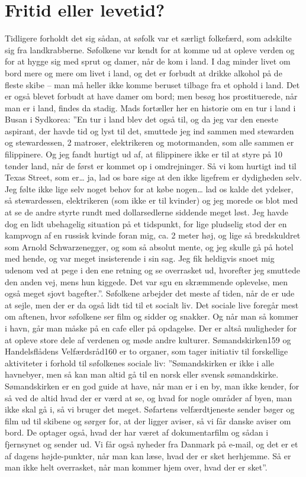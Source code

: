 \chapter{Fritid eller levetid?}\label{fritid-eller-levetid}

Tidligere forholdt det sig sådan, at søfolk var et særligt folkefærd,
som adskilte sig fra landkrabberne. Søfolkene var kendt for at komme ud
at opleve verden og for at hygge sig med sprut og damer, når de kom i
land. I dag minder livet om bord mere og mere om livet i land, og det er
forbudt at drikke alkohol på de fleste skibe -- man må heller ikke komme
beruset tilbage fra et ophold i land. Det er også blevet forbudt at have
damer om bord; men besøg hos prostituerede, når man er i land, findes da
stadig. Mads fortæller her en historie om en tur i land i Busan i
Sydkorea: ''En tur i land blev det også til, og da jeg var den eneste
aspirant, der havde tid og lyst til det, smuttede jeg ind sammen med
stewarden og stewardessen, 2 matroser, elektrikeren og motormanden, som
alle sammen er filippinere. Og jeg fandt hurtigt ud af, at filippinere
ikke er til at styre på 10 tønder land, når de først er kommet op i
omdrejninger. Så vi kom hurtigt ind til Texas Street, som er\ldots{} ja,
lad os bare sige at den ikke ligefrem er dydigheden selv. Jeg følte ikke
lige selv noget behov for at købe nogen\ldots{} lad os kalde det
ydelser, så stewardessen, elektrikeren (som ikke er til kvinder) og jeg
morede os blot med at se de andre styrte rundt med dollarsedlerne
siddende meget løst. Jeg havde dog en lidt ubehagelig situation på et
tidspunkt, for lige pludselig stod der en kampvogn af en russisk kvinde
foran mig, ca. 2 meter høj, og lige så bredskuldret som Arnold
Schwarzenegger, og som så absolut mente, og jeg skulle gå på hotel med
hende, og var meget insisterende i sin sag. Jeg fik heldigvis snoet mig
udenom ved at pege i den ene retning og se overrasket ud, hvorefter jeg
smuttede den anden vej, mens hun kiggede. Det var sgu en skræmmende
oplevelse, men også meget sjovt bagefter.''. Søfolkene arbejder det
meste af tiden, når de er ude at sejle, men der er da også lidt tid til
et socialt liv. Det sociale live foregår mest om aftenen, hvor søfolkene
ser film og sidder og snakker. Og når man så kommer i havn, går man
måske på en cafe eller på opdagelse. Der er altså muligheder for at
opleve store dele af verdenen og møde andre kulturer. Sømandskirken159
og Handelsflådens Velfærdsråd160 er to organer, som tager initiativ til
forskellige aktiviteter i forhold til søfolkenes sociale liv:
''Sømandskirken er ikke i alle havnebyer, men så kan man altid gå til en
norsk eller svensk sømandskirke. Sømandskirken er en god guide at have,
når man er i en by, man ikke kender, for så ved de altid hvad der er
værd at se, og hvad for nogle områder af byen, man ikke skal gå i, så vi
bruger det meget. Søfartens velfærdtjeneste sender bøger og film ud til
skibene og sørger for, at der ligger aviser, så vi får danske aviser om
bord. De optager også, hvad der har været af dokumentarfilm og sådan i
fjernsynet og sender ud. Vi får også nyheder fra Danmark på e-mail, og
det er et af dagens højde-punkter, når man kan læse, hvad der er sket
herhjemme. Så er man ikke helt overrasket, når man kommer hjem over,
hvad der er sket''.

